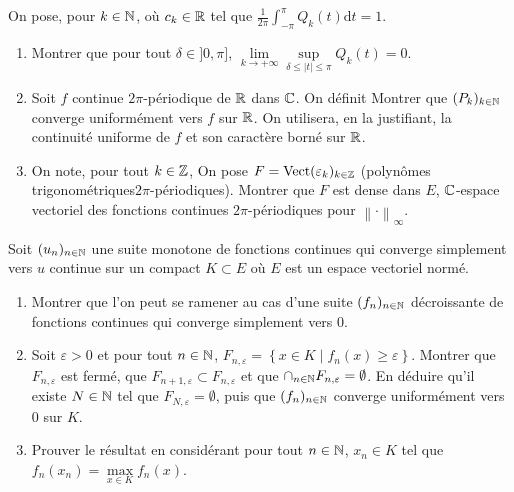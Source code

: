 \begin{exercise}
    On pose, pour $k\in\mathbb{N}$,  où $c_{k}\in\mathbb{R}$ tel que $\frac{1}{2\pi}\int_{-\pi}^{\pi}Q_{k}(t)\mathrm{d}t=1$.
    \begin{enumerate}
        \item Montrer que pour tout $\delta\in]0,\pi]$, $\lim\limits_{k\to+\infty}\sup\limits_{\delta\leqslant\left\lvert t\right\rvert\leqslant\pi}Q_{k}(t)=0$.
        \item Soit $f$ continue $2\pi$-périodique de $\mathbb{R}$ dans $\mathbb{C}$. On définit 
        Montrer que $(P_k)_{k\in\mathbb{N}}$ converge uniformément vers $f$ sur $\mathbb{R}$. On utilisera, en la justifiant, la continuité uniforme de $f$ et son caractère borné sur $\mathbb{R}$.
        \item On note, pour tout $k\in\mathbb{Z}$, 
        On pose $F=\operatorname{Vect}(\varepsilon_{k})_{k\in\mathbb{Z}}$ (\og polynômes trigonométriques\fg $2\pi$-périodiques). Montrer que $F$ est dense dans $E$, $\mathbb{C}$-espace vectoriel des fonctions continues $2\pi$-périodiques pour $\left\lVert\cdot\right\rVert_{\infty}$.
    \end{enumerate}
\end{exercise}

\begin{exercise}
    Soit $(u_n)_{n\in\mathbb{N}}$ une suite monotone de fonctions continues qui converge simplement vers $u$ continue sur un compact $K\subset E$ où $E$ est un espace vectoriel normé.
    \begin{enumerate}
        \item Montrer que l'on peut se ramener au cas d'une suite $(f_n)_{n\in\mathbb{N}}$ décroissante de fonctions continues qui converge simplement vers 0.
        \item Soit $\varepsilon>0$ et pour tout $n\in\mathbb{N}$, $F_{n,\varepsilon}=\left\lbrace x\in K\middle| f_{n}(x)\geqslant\varepsilon\right\rbrace$. Montrer que $F_{n,\varepsilon}$ est fermé, que $F_{n+1,\varepsilon}\subset F_{n,\varepsilon}$ et que $\cap_{n\in\mathbb{N}}F_{n,\varepsilon}=\emptyset$. En déduire qu'il existe $N\in\mathbb{N}$ tel que $F_{N,\varepsilon}=\emptyset$, puis que $(f_{n})_{n\in\mathbb{N}}$ converge uniformément vers 0 sur $K$.
        \item Prouver le résultat en considérant pour tout $n\in\mathbb{N}$, $x_{n}\in K$ tel que $f_{n}(x_{n})=\max\limits_{x\in K}f_n(x)$.
    \end{enumerate}
\end{exercise}